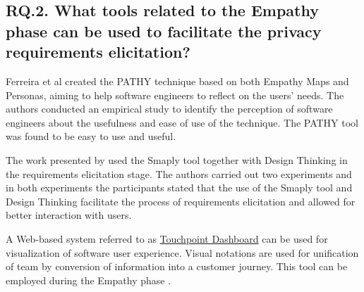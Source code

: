 \documentclass[conference]{IEEEtran}
\begin{document}
\subsection{RQ.2. What tools related to the Empathy phase can be used to facilitate the privacy requirements elicitation?}


Ferreira et al \cite{DBLP:conf/hci/FerreiraBC16} created the PATHY technique based on both Empathy Maps and Personas, aiming to help software engineers to reflect on the users' needs. The authors conducted an empirical study to identify the perception of software engineers about the usefulness and ease of use of the technique. The PATHY tool was found to be easy to use and useful.


The work presented by \cite{DBLP:conf/hci/ChasanidouGL15} used the Smaply tool together with Design Thinking in the requirements elicitation stage. The authors carried out two experiments and in both experiments the participants stated that the use of the Smaply tool and Design Thinking facilitate the process of requirements elicitation and allowed for better interaction with users.

A Web-based system referred to as \href{www.touchpointdashboard.com}{Touchpoint Dashboard} can be used for visualization of software user experience. Visual notations are used for unification of team by conversion of information into a customer journey.  This tool can be employed during the Empathy phase \cite{kumar2020methods}.

\end{document}
